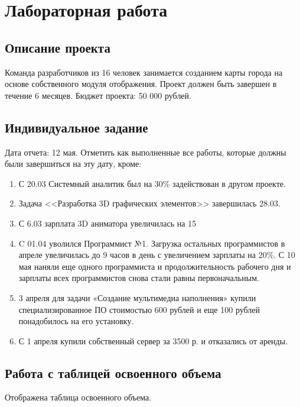 \chapter{Лабораторная работа}

\section{Описание проекта}

Команда разработчиков из 16 человек занимается созданием карты города на основе собственного модуля отображения. Проект должен быть завершен в течение 6 месяцев. Бюджет проекта: 50 000 рублей.

\section{Индивидуальное задание}

Дата отчета: 12 мая.
Отметить как выполненные все работы, которые должны были завершиться на эту дату, кроме:
\begin{enumerate}
    \item С 20.03 Системный аналитик был на 30\% задействован в другом проекте.
    \item Задача <<Разработка 3D графических элементов>> завершилась 28.03.
    \item С 6.03 зарплата 3D аниматора увеличилась на 15%
    \item C 01.04 уволился Программист №1. Загрузка остальных программистов в апреле увеличилась до 9 часов в день с увеличением зарплаты на 20\%. С 10 мая наняли еще одного программиста и продолжительность рабочего дня и зарплаты всех программистов снова стали равны первоначальным.
    \item 3 апреля для задачи «Создание мультимедиа наполнения» купили специализированное ПО стоимостью 600 рублей и еще 100 рублей понадобилось на его установку.
    \item С 1 апреля купили собственный сервер за 3500 р. и отказались от аренды.
\end{enumerate}

\clearpage

\section{Работа с таблицей освоенного объема}

Отображена таблица освоенного объема.


